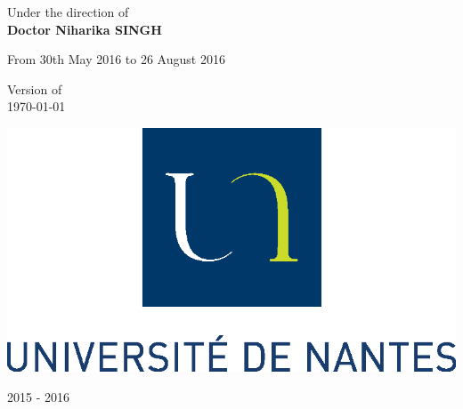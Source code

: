 \begin{titlepage}
\begin{center}

\Large{Under the direction of} \\
\Large{\textbf{Doctor Niharika SINGH}} 

\vfill





\Large{From 30th May 2016 to 26 August 2016}

\vfill

\large{Version of} \\
\large{\today} 

\vfill

\includegraphics[scale=0.6]{images/logo_ecoles/Universite_de_Nantes_} 

\vfill

\large{2015 - 2016} 





\end{center}

\end{titlepage}